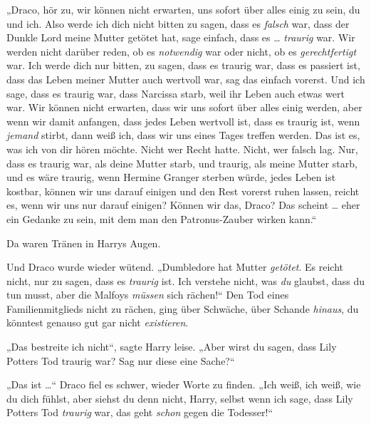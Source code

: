„Draco, hör zu, wir können nicht erwarten, uns sofort über alles einig zu sein, du und ich. Also werde ich dich nicht bitten zu sagen, dass es \emph{falsch} war, dass der Dunkle Lord meine Mutter getötet hat, sage einfach, dass es … \emph{traurig} war. Wir werden nicht darüber reden, ob es \emph{notwendig} war oder nicht, ob es \emph{gerechtfertigt} war. Ich werde dich nur bitten, zu sagen, dass es traurig war, dass es passiert ist, dass das Leben meiner Mutter auch wertvoll war, sag das einfach vorerst. Und ich sage, dass es traurig war, dass Narcissa starb, weil ihr Leben auch etwas wert war. Wir können nicht erwarten, dass wir uns sofort über alles einig werden, aber wenn wir damit anfangen, dass jedes Leben wertvoll ist, dass es traurig ist, wenn \emph{jemand} stirbt, dann weiß ich, dass wir uns eines Tages treffen werden. Das ist es, was ich von dir hören möchte. Nicht wer Recht hatte. Nicht, wer falsch lag. Nur, dass es traurig war, als deine Mutter starb, und traurig, als meine Mutter starb, und es wäre traurig, wenn Hermine Granger sterben würde, jedes Leben ist kostbar, können wir uns darauf einigen und den Rest vorerst ruhen lassen, reicht es, wenn wir uns nur darauf einigen? Können wir das, Draco? Das scheint … eher ein Gedanke zu sein, mit dem man den Patronus-Zauber wirken kann.“

Da waren Tränen in Harrys Augen.

Und Draco wurde wieder wütend.
„Dumbledore hat Mutter \emph{getötet}. Es reicht nicht, nur zu sagen, dass es \emph{traurig} ist. Ich verstehe nicht, was \emph{du} glaubst, dass du tun musst, aber die Malfoys \emph{müssen} sich rächen!“ Den Tod eines Familienmitglieds nicht zu rächen, ging über Schwäche, über Schande \emph{hinaus}, du könntest genauso gut gar nicht \emph{existieren}.

„Das bestreite ich nicht“, sagte Harry leise.
„Aber wirst du sagen, dass Lily Potters Tod traurig war? Sag nur diese eine Sache?“

„Das ist …“ Draco fiel es schwer, wieder Worte zu finden.
„Ich weiß, ich weiß, wie du dich fühlst, aber siehst du denn nicht, Harry, selbst wenn ich sage, dass Lily Potters Tod \emph{traurig} war, das geht \emph{schon} gegen die Todesser!“

